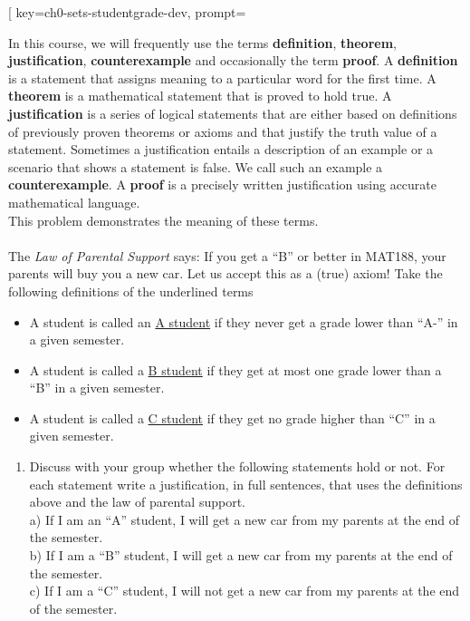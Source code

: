 \begin{SaveQuestion}[
        key=ch0-sets-studentgrade-dev, 
		prompt={In this course, we will frequently use the terms \textbf{definition}, \textbf{theorem}, \textbf{justification}, \textbf{counterexample} and occasionally the term \textbf{proof}. A \textbf{definition} is a statement that assigns meaning to a particular word for the first time. A \textbf{theorem} is a mathematical statement that is proved to hold true. A \textbf{justification} is a series of logical statements that are either based on definitions of previously proven theorems or axioms and that justify the truth value of a statement. Sometimes a justification entails a description of an example or a scenario that shows a statement is false. We call such an example a \textbf{counterexample}. A \textbf{proof} is a precisely written justification using accurate mathematical language.\\This problem demonstrates the meaning of these terms. \\ \\
	The \emph{Law of Parental Support} says: If you get a ``B'' or better in MAT188, your parents will buy you a new car.  Let us accept this as a (true) axiom! Take the following definitions of the underlined terms
	\begin{itemize}
		\item  A student is called	an \underline{A student}  if they never get a grade lower than ``A-'' in a given semester.
		\item  A student is called	a \underline{B student} if they get at most one grade lower than a ``B'' in a given	semester.
	\item  A student is called a \underline{C student} if they get no grade higher than ``C'' in a given semester.
	\end{itemize}
	\medskip
	\noindent
	\begin{enumerate}
		\item 	Discuss with your group whether the following statements hold or not. For each statement write a justification, in full sentences, that uses the definitions above and the law of parental support. \\
		a) If I am an ``A'' student, I will get a new car from my
		parents at the end of the semester.\\
		b) If I am a ``B'' student, I will get a new car from my
		parents at the end of the semester. \\
		c) If I am a ``C'' student, I will not get a new car from my
		parents at the end of the semester.

\end{enumerate}}
\end{SaveQuestion}
